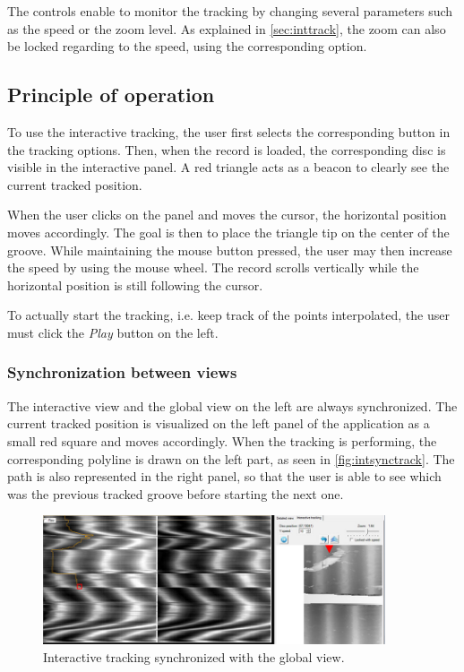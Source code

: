 The controls enable to monitor the tracking by changing several parameters such as the speed or the zoom level. As explained in \autoref{sec:inttrack}, the zoom can also be locked regarding to the speed, using the corresponding option.

\subsection{Principle of operation}

To use the interactive tracking, the user first selects the corresponding button in the tracking options. Then, when the record is loaded, the corresponding disc is visible in the interactive panel. A red triangle acts as a beacon to clearly see the current tracked position.

When the user clicks on the panel and moves the cursor, the horizontal position moves accordingly. The goal is then to place the triangle tip on the center of the groove. While maintaining the mouse button pressed, the user may then increase the speed by using the mouse wheel. The record scrolls vertically while the horizontal position is still following the cursor.

To actually start the tracking, i.e. keep track of the points interpolated, the user must click the \emph{Play} button on the left.

\subsubsection{Synchronization between views}

The interactive view and the global view on the left are always synchronized. The current tracked position is visualized on the left panel of the application as a small red square and moves accordingly. When the tracking is performing, the corresponding polyline is drawn on the left part, as seen in \autoref{fig:intsynctrack}. The path is also represented in the right panel, so that the user is able to see which was the previous tracked groove before starting the next one.

\begin{figure}[!ht]
\centering
\includegraphics[width=0.9\textwidth]{images/int-track-sync}
\caption{Interactive tracking synchronized with the global view.}
\label{fig:intsynctrack}
\end{figure}

